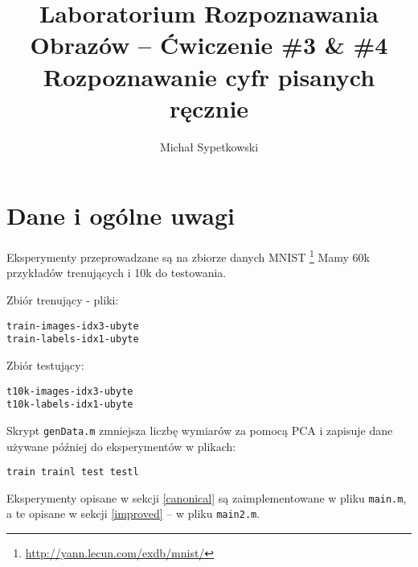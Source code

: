 \documentclass[a4paper]{article}
\begin{document}
\title{ Laboratorium Rozpoznawania Obrazów – Ćwiczenie \#3 \& \#4 Rozpoznawanie cyfr pisanych ręcznie }


\author{Michał Sypetkowski}
\maketitle










\section{Dane i ogólne uwagi}
Eksperymenty przeprowadzane są na zbiorze danych MNIST
\footnote{\url{http://yann.lecun.com/exdb/mnist/}}
Mamy 60k przykładów trenujących i 10k do testowania.

Zbiór trenujący - pliki:
\begin{verbatim}
train-images-idx3-ubyte
train-labels-idx1-ubyte
\end{verbatim}

Zbiór testujący:
\begin{verbatim}
t10k-images-idx3-ubyte
t10k-labels-idx1-ubyte
\end{verbatim}

Skrypt \texttt{genData.m} zmniejsza liczbę wymiarów za pomocą PCA
i zapisuje dane używane później do eksperymentów w plikach:
\begin{verbatim}
train trainl test testl
\end{verbatim}

Eksperymenty opisane w sekcji \ref{canonical} są zaimplementowane w pliku \texttt{main.m},
a te opisane w sekcji \ref{improved} -- w pliku \texttt{main2.m}.
\end{document}
